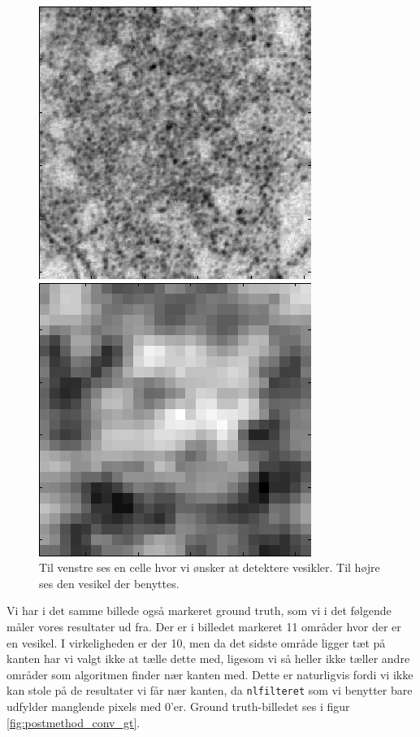 \begin{figure}[H]
	\begin{minipage}[b]{0.5\linewidth}
		\centering
		\includegraphics[scale=0.5]{files/postmethod/img/conv_1.png}
	\end{minipage}
	\hspace{0.5cm}
	\begin{minipage}[b]{0.5\linewidth}
		\centering
		\includegraphics[scale=0.5]{files/postmethod/img/conv_2.png}
	\end{minipage}
	\caption{Til venstre ses en celle hvor vi ønsker at detektere vesikler. Til højre ses den vesikel der benyttes.\label{fig:postmethod_conv_pre}}
\end{figure}

Vi har i det samme billede også markeret ground truth, som vi i det følgende måler vores resultater ud fra. Der er i billedet markeret 11 områder hvor der er en vesikel. I virkeligheden er der 10, men da det sidste område ligger tæt på kanten har vi valgt ikke at tælle dette med, ligesom vi så heller ikke tæller andre områder som algoritmen finder nær kanten med. Dette er naturligvis fordi vi ikke kan stole på de resultater vi får nær kanten, da \texttt{nlfilteret} som vi benytter bare udfylder manglende pixels med 0'er. Ground truth-billedet ses i figur \ref{fig:postmethod_conv_gt}. 

